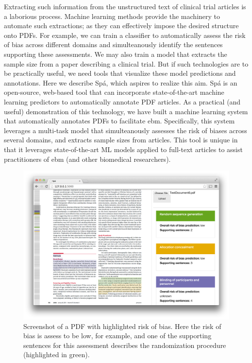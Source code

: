 \documentclass[runningheads,a4paper]{llncs}
\begin{document}
Extracting such information from the unstructured text of clinical trial articles is a laborious process.
Machine learning methods provide the machinery to automate such extractions; as they can effectively impose the desired structure onto PDFs.
For example, we can train a classifier to automatically assess the risk of bias across different domains and simulteanously identify the sentences supporting these assessments.
We may also train a model that extracts the sample size from a paper describing a clinical trial. 
But if such technologies are to be practically useful, we need tools that visualize these model predictions and annotations.
Here we describe Spá, which aspires to realize this aim.
Spá is an open-source, web-based tool that can incorporate state-of-the-art machine learning predictors to automatically annotate PDF articles.
As a practical (and useful) demonstration of this technology, we have built a machine learning system that automatically annotates PDFs to facilitate \ac{ebm}. 
Specifically, this system leverages a multi-task model that simulteanously assesses the risk of biases across several domains, and extracts sample sizes from articles.
This tool is unique in that it leverages state-of-the-art ML models applied to full-text articles to assist practitioners of \ac{ebm} (and other biomedical researchers). 
 
\begin{figure}[htb]
	\vspace{-2em}
\centering
\includegraphics[width=.8\linewidth]{./images/screenshot2.png}
\vspace{-1em}
\caption{\label{fig:screenshot}Screenshot of a PDF with highlighted risk of bias. Here the risk of bias is assess to be low, for example, and one of the supporting sentences for this assessment describes the randomization procedure (highlighted in green).}
\vspace{-2em}
\end{figure}
\end{document}
